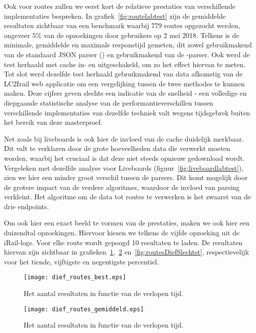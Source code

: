 Ook voor routes zullen we eerst kort de relatieve prestaties van verschillende implementaties bespreken. In grafiek~\ref{fig:routelabtest} zijn de gemiddelde resultaten zichtbaar van een benchmark waarbij 779 routes opgezocht werden, ongeveer 5\% van de opzoekingen door gebruikers op 2 mei 2018. Telkens is de minimale, gemiddelde en maximale responstijd gemeten, dit zowel gebruikmakend van de standaard JSON parser () en gebruikmakend van de -parser. Ook werd de test herhaald met cache in- en uitgeschakeld, om zo het effect hiervan te meten. Tot slot werd dezelfde test herhaald gebruikmakend van data afkomstig van de LC2Irail web applicatie om een vergelijking tussen de twee methodes te kunnen maken. Deze cijfers geven slechts een indicatie van de snelheid - een volledige en diepgaande statistische analyse van de performantieverschillen tussen verschillende implementaties van dezelfde techniek valt wegens tijdsgebrek buiten het bereik van deze masterproef.

Net zoals bij liveboards is ook hier de invloed van de cache duidelijk merkbaar. Dit valt te verklaren door de grote hoeveelheden data die verwerkt moeten worden, waarbij het cruciaal is dat deze niet steeds opnieuw gedownload wordt. Vergeleken met dezelfde analyse voor Liveboards (figuur~\ref{fig:liveboardlabtest}), zien we hier een minder groot verschil tussen de parsers. Dit komt mogelijk door de grotere impact van de verdere algoritmes, waardoor de invloed van parsing verkleint. Het algoritme om de data tot routes te verwerken is het zwaarst van de drie endpoints. %

Om ook hier een exact beeld te vormen van de prestaties, maken we ook hier een duizendtal opzoekingen. Hiervoor kiezen we telkens de vijfde opzoeking uit de iRail-logs. Voor elke route wordt gepoogd 10 resultaten te laden. De resultaten hiervan zijn zichtbaar in grafieken~\ref{fig:routesDiefBest},~\ref{fig:routesDiefAvg} en~\ref{fig:routesDiefSlechtst}, respectievelijk voor het tiende, vijftigste en negentigste percentiel.

\begin{figure}[h]
	\centering
	\texttt{[image: dief\_routes\_best.eps]}
	\caption[Aantal resultaten routes in functie van de tijd (10e percentiel)]{Het aantal resultaten in functie van de verlopen tijd.}
	\label{fig:routesDiefBest}
\end{figure}

\begin{figure}[h]
	\centering
	\texttt{[image: dief\_routes\_gemiddeld.eps]}
	\caption[Aantal resultaten routes in functie van de tijd (mediaan)]{Het aantal resultaten in functie van de verlopen tijd.}
	\label{fig:routesDiefAvg}
\end{figure}


